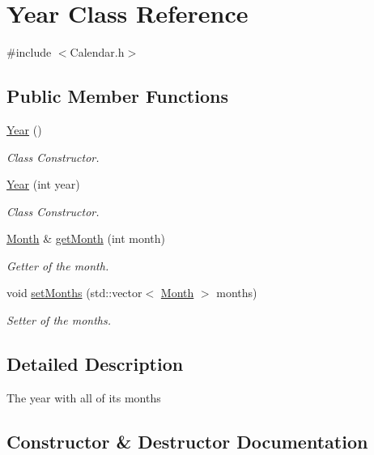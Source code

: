 \hypertarget{class_year}{}\section{Year Class Reference}
\label{class_year}


{\ttfamily \#include $<$Calendar.\+h$>$}

\subsection*{Public Member Functions}
\begin{DoxyCompactItemize}
\item 
\mbox{\hyperlink{class_year_af5910fa97849bd9b700262477fd1fd24}{Year}} ()
\begin{DoxyCompactList}\small\item\em Class Constructor. \end{DoxyCompactList}\item 
\mbox{\hyperlink{class_year_ac18a4f513e8ee98b352990c6f54bd663}{Year}} (int year)
\begin{DoxyCompactList}\small\item\em Class Constructor. \end{DoxyCompactList}\item 
\mbox{\hyperlink{class_month}{Month}} \& \mbox{\hyperlink{class_year_a64bc478fe629fc966b7bfadb1d939a88}{get\+Month}} (int month)
\begin{DoxyCompactList}\small\item\em Getter of the month. \end{DoxyCompactList}\item 
void \mbox{\hyperlink{class_year_a1478407d9100f722e54daaf1ce2a413c}{set\+Months}} (std\+::vector$<$ \mbox{\hyperlink{class_month}{Month}} $>$ months)
\begin{DoxyCompactList}\small\item\em Setter of the months. \end{DoxyCompactList}\end{DoxyCompactItemize}


\subsection{Detailed Description}
The year with all of its months 

\subsection{Constructor \& Destructor Documentation}
\mbox{\label{class_year_af5910fa97849bd9b700262477fd1fd24}} 
